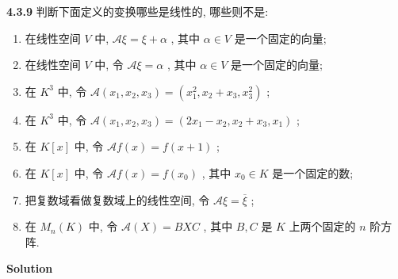 \documentclass[11pt,a4paper,openany,oneside]{book}
\newcommand\Solution{\noindent\textbf{\textsf{Solution}}\par\medskip}
\begin{document}
\begin{myexample}
\textbf{4.3.9} 判断下面定义的变换哪些是线性的, 哪些则不是:
\begin{enumerate}[(1)]
	\item 在线性空间 $ V $ 中,  $ \mathcal{A}\xi = \xi + \alpha $ , 其中 $ \alpha \in V $ 是一个固定的向量;
	
	\item 在线性空间 $ V $ 中, 令 $ \mathcal{A}\xi = \alpha $ , 其中 $ \alpha \in V $ 是一个固定的向量;
	
	\item 在 $ K^3 $ 中, 令 $ \mathcal{A}(x_1, x_2, x_3) = (x_1^2, x_2+x_3, x_3^2) $ ;
	
	\item 在 $ K^3 $ 中, 令 $ \mathcal{A}(x_1, x_2, x_3) = (2x_1-x_2, x_2 + x_3 , x_1) $ ;
	
	\item 在 $ K[x] $ 中, 令 $ \mathcal{A}f(x) = f(x+1) $ ;
	
	\item 在 $ K[x] $ 中, 令 $ \mathcal{A}f(x) = f(x_0) $ , 其中 $ x_0 \in K $ 是一个固定的数;
	
	\item 把复数域看做复数域上的线性空间, 令 $ \mathcal{A}\xi = \overline{\xi} $ ;
	
	\item 在 $ M_n(K) $ 中, 令 $ \mathcal{A}(X) = BXC $ , 其中 $ B,C $ 是 $ K $ 上两个固定的 $ n $ 阶方阵. 
\end{enumerate}

\end{myexample}
\Solution
\end{document}
